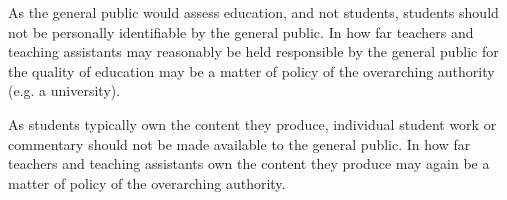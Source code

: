 As the general public would assess education, and not students, students should
not be personally identifiable by the general public. In how far teachers and
teaching assistants may reasonably be held responsible by the general public
for the quality of education may be a matter of policy of the overarching
authority (e.g.  a university).

As students typically own the content they produce, individual student work or
commentary should not be made available to the general public. In how far
teachers and teaching assistants own the content they produce may again be a
matter of policy of the overarching authority.
